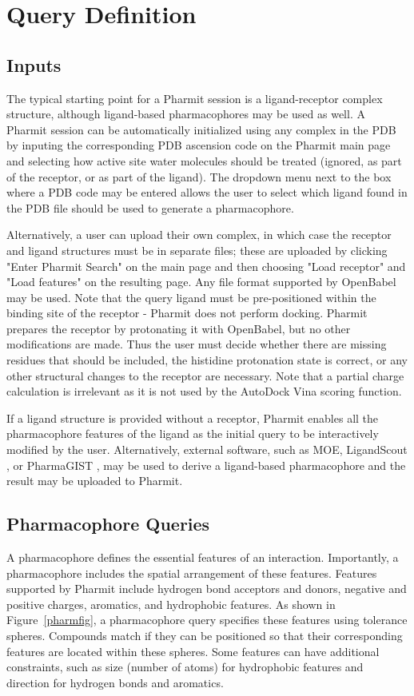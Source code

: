 \section{Query Definition}


\subsection{Inputs}

The typical starting point for a Pharmit session is a ligand-receptor complex structure, although ligand-based pharmacophores may be used as well. A Pharmit session can be automatically initialized using any complex in the PDB by inputing the corresponding PDB ascension code on the Pharmit main page and selecting how active site water molecules should be treated (ignored, as part of the receptor, or as part of the ligand).  The dropdown menu next to the box where a PDB code may be entered allows the user to select which ligand found in the PDB file should be used to generate a pharmacophore.  

Alternatively, a user can upload their own complex, in which case the receptor and ligand structures must be in separate files; these are uploaded by clicking "Enter Pharmit Search" on the main page and then choosing "Load receptor" and "Load features" on the resulting page. Any file format supported by OpenBabel \cite{O_Boyle_2011} may be used. 
 Note that the query ligand must be pre-positioned within the binding site of the receptor - Pharmit does not perform docking.
Pharmit prepares the receptor by protonating it with OpenBabel, but no other modifications are made. Thus the user must decide whether there are missing residues that should be included, the histidine protonation state is correct, or any other structural changes to the receptor are necessary.  Note that a partial charge calculation is irrelevant as it is not used by the AutoDock Vina scoring function.  

If a ligand structure is provided without a receptor, Pharmit enables all the pharmacophore features of the ligand as the initial query to be interactively modified by the user. Alternatively, external software, such as MOE, LigandScout \cite{Wolber_2005}, or PharmaGIST \cite{Schneidman_Duhovny_2008}, may be used to derive a ligand-based pharmacophore and the result may be uploaded to Pharmit.

\subsection{Pharmacophore Queries}
A pharmacophore \cite{Koes_2015rev,Yang_2010,Leach_2010} defines the essential features of an interaction. Importantly, a pharmacophore includes the spatial arrangement of these features. 
Features supported by Pharmit include hydrogen bond acceptors and donors,  negative and positive charges, aromatics, and hydrophobic features.
As shown in Figure~\ref{pharmfig}, a pharmacophore query specifies these features using tolerance spheres.  Compounds match if they can be positioned so that their corresponding features are located within these spheres. Some features can have additional constraints, such as size (number of atoms) for hydrophobic features and direction for hydrogen bonds and aromatics.

